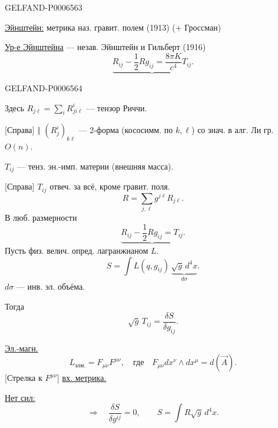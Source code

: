 \begin{GelfandAdjacentEvidence}{GELFAND-P000656}{3}


\underline{Эйнштейн:} метрика наз. гравит. полем (1913) (+ Гроссман)

\underline{Ур-е Эйнштейна} --- незав. Эйнштейн и Гильберт (1916)
\[
\underbrace{R_{ij}-\frac12Rg_{ij}=\frac{8\pi K}{c^4}T_{ij}}.
\]
\end{GelfandAdjacentEvidence}
\begin{GelfandAdjacentEvidence}{GELFAND-P000656}{4}


Здесь \(R_{j\ell}=\sum_i R^i_{ji\ell}\) --- тензор Риччи.

[Справа] \(\Vert\) \((R^i_j)_{k\ell}\) --- 2-форма
(кососимм. по \(k,\ell\)) со знач. в алг. Ли гр. \(O(n)\).

\(T_{ij}\) --- тенз. эн.-имп. материи (внешняя масса).

[Справа] \(T_{ij}\) отвеч. за всё, кроме гравит. поля.
\[
R=\sum_{j,\ell}g^{j\ell}R_{j\ell}.
\]
В люб. размерности
\[
\underbrace{R_{ij}-\frac12Rg_{ij}=T_{ij}}.
\]
Пусть физ. велич. опред. лагранжианом \(L\).
\[
S=\int L(q,g_{ij})\,\underbrace{\sqrt g\,d^4x}_{d\sigma}.
\]
\(d\sigma\) --- инв. эл. объёма.

Тогда
\[
\sqrt g\,T_{ij}=\frac{\delta S}{\delta g_{ij}}.
\]
\end{GelfandAdjacentEvidence}


\underline{Эл.-магн.}
\[
L_{\text{элм.}}=F_{\mu\nu}F^{\mu\nu},\quad
\text{где}\quad F_{\mu\nu}dx^\nu\wedge dx^\mu=d(\vec A).
\]
[Стрелка к \(F^{\mu\nu}\)] \underline{вх. метрика.}

\underline{Нет сил:}
\[
\Longrightarrow\quad\frac{\delta S}{\delta g^{ij}}=0,
\qquad S=\int R\sqrt g\,d^4x.
\]


